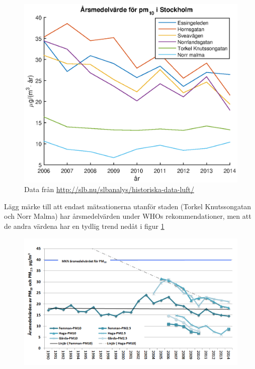 \begin{figure}[H]
	\centering
	\includegraphics[width=.8\textwidth]{Bilder/pm10sth}
	\caption{Data från \url{http://slb.nu/slbanalys/historiska-data-luft/}}
	\label{fig:pm10sth}
\end{figure}
Lägg märke till att endast mätsationerna utanför staden (Torkel Knutssongatan och Norr Malma) har årsmedelvärden under WHOs rekommendationer, men att de andra värdena har en tydlig trend nedåt i figur \ref{fig:pm10sth}

\begin{figure}[H]
	\centering
	\includegraphics[width=.8\textwidth]{Bilder/pm10gbg}
	\caption{\cite{gbg}}
	\label{fig:pm10gbg}
\end{figure}
